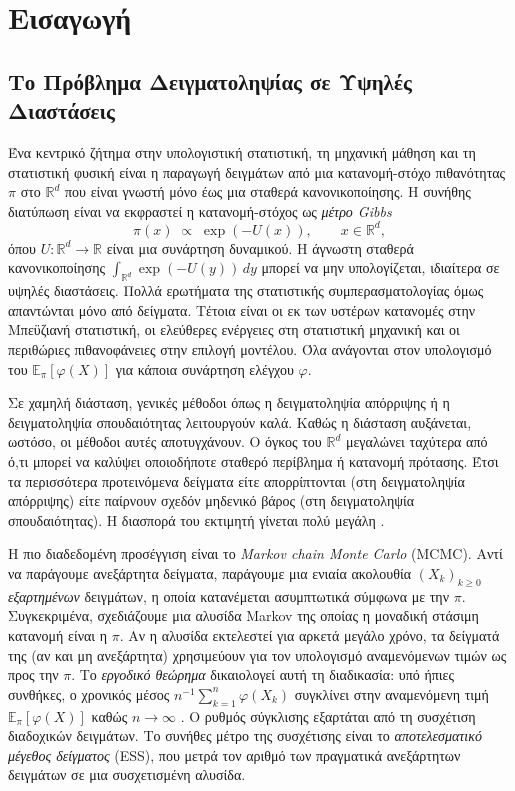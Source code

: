 \chapter{Εισαγωγή}
\label{chap:introduction}

\section{Το Πρόβλημα Δειγματοληψίας σε Υψηλές Διαστάσεις}
\label{sec:intro-sampling}

Ένα κεντρικό ζήτημα στην υπολογιστική στατιστική, τη μηχανική μάθηση και τη
στατιστική φυσική είναι η παραγωγή δειγμάτων από μια κατανομή-στόχο πιθανότητας
$\pi$ στο $\mathbb{R}^d$ που είναι γνωστή μόνο έως μια σταθερά κανονικοποίησης.
Η συνήθης διατύπωση είναι να εκφραστεί η κατανομή-στόχος ως \emph{μέτρο Gibbs}
\begin{equation}
  \pi(x) \;\propto\; \exp(-U(x)), \qquad x \in \mathbb{R}^d,
  \label{eq:gibbs-intro}
\end{equation}
όπου $U : \mathbb{R}^d \to \mathbb{R}$ είναι μια συνάρτηση δυναμικού.
Η άγνωστη σταθερά κανονικοποίησης $\int_{\mathbb{R}^d} \exp(-U(y))\, dy$ μπορεί να μην
υπολογίζεται, ιδιαίτερα σε υψηλές διαστάσεις. Πολλά ερωτήματα της στατιστικής
συμπερασματολογίας όμως απαντώνται μόνο από δείγματα. Τέτοια είναι οι εκ των
υστέρων κατανομές στην Μπεϋζιανή στατιστική, οι ελεύθερες ενέργειες στη
στατιστική μηχανική και οι περιθώριες πιθανοφάνειες στην επιλογή μοντέλου. Όλα
ανάγονται στον υπολογισμό του $\mathbb{E}_\pi[\varphi(X)]$ για κάποια συνάρτηση ελέγχου $\varphi$.

Σε χαμηλή διάσταση, γενικές μέθοδοι όπως η δειγματοληψία απόρριψης ή η δειγματοληψία σπουδαιότητας λειτουργούν καλά. Καθώς η διάσταση αυξάνεται, ωστόσο,
οι μέθοδοι αυτές αποτυγχάνουν. Ο όγκος του $\mathbb{R}^d$ μεγαλώνει ταχύτερα
από ό,τι μπορεί να καλύψει οποιοδήποτε σταθερό περίβλημα ή κατανομή πρότασης.
Έτσι τα περισσότερα προτεινόμενα δείγματα είτε απορρίπτονται (στη δειγματοληψία απόρριψης) είτε παίρνουν σχεδόν μηδενικό βάρος (στη δειγματοληψία σπουδαιότητας). Η διασπορά του εκτιμητή γίνεται πολύ μεγάλη
\citep{robert2004monte}.

Η πιο διαδεδομένη προσέγγιση είναι το \emph{Markov chain Monte Carlo} (MCMC). Αντί να
παράγουμε ανεξάρτητα δείγματα, παράγουμε μια ενιαία ακολουθία
$(X_k)_{k\geq 0}$ \emph{εξαρτημένων} δειγμάτων, η οποία κατανέμεται
ασυμπτωτικά σύμφωνα με την $\pi$. Συγκεκριμένα, σχεδιάζουμε μια
αλυσίδα Markov της οποίας η μοναδική στάσιμη κατανομή είναι η $\pi$. Αν η αλυσίδα
εκτελεστεί για αρκετά μεγάλο χρόνο, τα δείγματά της (αν και μη ανεξάρτητα)
χρησιμεύουν για τον υπολογισμό αναμενόμενων τιμών ως προς την $\pi$.
Το \emph{εργοδικό
θεώρημα} δικαιολογεί αυτή τη διαδικασία: υπό ήπιες συνθήκες, ο χρονικός μέσος $n^{-1}\sum_{k=1}^n \varphi(X_k)$
συγκλίνει στην αναμενόμενη τιμή $\mathbb{E}_\pi[\varphi(X)]$ καθώς $n \to \infty$
\citep{meyn2009markov, tierney1994markov}. Ο ρυθμός σύγκλισης εξαρτάται από τη
συσχέτιση διαδοχικών δειγμάτων. Το συνήθες μέτρο της συσχέτισης είναι το
\emph{αποτελεσματικό μέγεθος δείγματος} (ESS), που μετρά τον αριθμό των
πραγματικά ανεξάρτητων δειγμάτων σε μια συσχετισμένη αλυσίδα.

